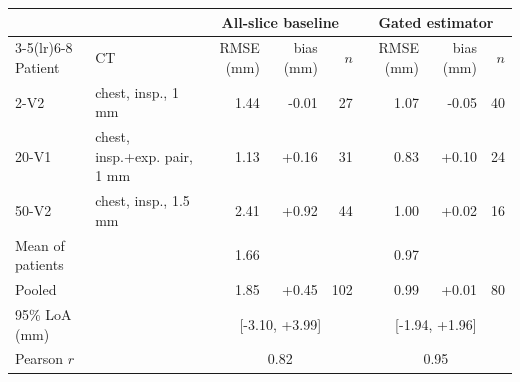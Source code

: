 \begin{tabular}{llrrrrrr}
\toprule
 & & \multicolumn{3}{c}{All-slice baseline} & \multicolumn{3}{c}{Gated estimator} \\
\cmidrule(lr){3-5}\cmidrule(lr){6-8}
Patient & CT & RMSE (mm) & bias (mm) & $n$ & RMSE (mm) & bias (mm) & $n$ \\
\midrule
2-V2 & chest, insp., 1 mm & 1.44 & -0.01 & 27 & 1.07 & -0.05 & 40 \\
20-V1 & chest, insp.+exp. pair, 1 mm & 1.13 & +0.16 & 31 & 0.83 & +0.10 & 24 \\
50-V2 & chest, insp., 1.5 mm & 2.41 & +0.92 & 44 & 1.00 & +0.02 & 16 \\
\midrule
Mean of patients & & 1.66 & & & 0.97 & & \\
Pooled & & 1.85 & +0.45 & 102 & 0.99 & +0.01 & 80 \\
95\% LoA (mm) & & \multicolumn{3}{c}{[-3.10, +3.99]} & \multicolumn{3}{c}{[-1.94, +1.96]} \\
Pearson $r$ & & \multicolumn{3}{c}{0.82} & \multicolumn{3}{c}{0.95} \\
\bottomrule
\end{tabular}
